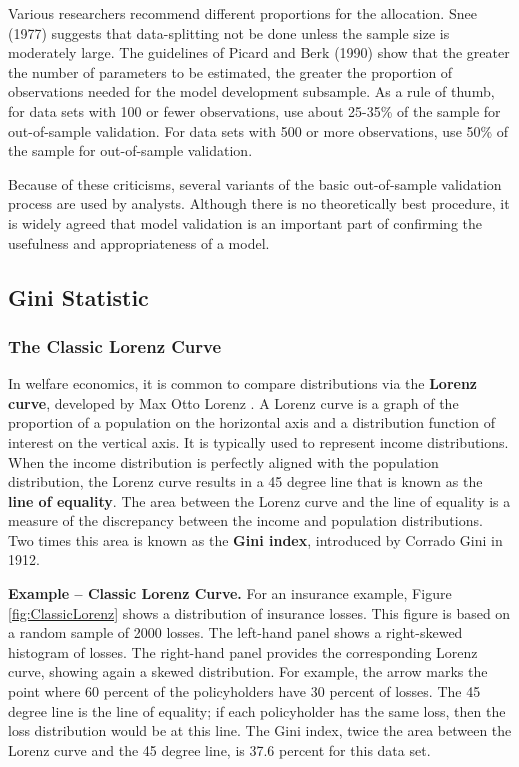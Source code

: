 \documentclass[]{book}
\theoremstyle{definition}
\theoremstyle{definition}
\theoremstyle{definition}
\theoremstyle{remark}
\begin{document}
Various researchers recommend different proportions for the allocation.
Snee (1977) suggests that data-splitting not be done unless the sample
size is moderately large. The guidelines of Picard and Berk (1990) show
that the greater the number of parameters to be estimated, the greater
the proportion of observations needed for the model development
subsample. As a rule of thumb, for data sets with 100 or fewer
observations, use about 25-35\% of the sample for out-of-sample
validation. For data sets with 500 or more observations, use 50\% of the
sample for out-of-sample validation.

Because of these criticisms, several variants of the basic out-of-sample
validation process are used by analysts. Although there is no
theoretically best procedure, it is widely agreed that model validation
is an important part of confirming the usefulness and appropriateness of
a model.

\subsection{Gini Statistic}\label{gini-statistic}

\subsubsection{The Classic Lorenz Curve}\label{the-classic-lorenz-curve}

In welfare economics, it is common to compare distributions via the
\textbf{Lorenz curve}, developed by Max Otto Lorenz
\citep{lorenz1905methods}. A Lorenz curve is a graph of the proportion
of a population on the horizontal axis and a distribution function of
interest on the vertical axis. It is typically used to represent income
distributions. When the income distribution is perfectly aligned with
the population distribution, the Lorenz curve results in a 45 degree
line that is known as the \textbf{line of equality}. The area between
the Lorenz curve and the line of equality is a measure of the
discrepancy between the income and population distributions. Two times
this area is known as the \textbf{Gini index}, introduced by Corrado
Gini in 1912.

\textbf{Example -- Classic Lorenz Curve.} For an insurance example,
Figure \ref{fig:ClassicLorenz} shows a distribution of insurance losses.
This figure is based on a random sample of 2000 losses. The left-hand
panel shows a right-skewed histogram of losses. The right-hand panel
provides the corresponding Lorenz curve, showing again a skewed
distribution. For example, the arrow marks the point where 60 percent of
the policyholders have 30 percent of losses. The 45 degree line is the
line of equality; if each policyholder has the same loss, then the loss
distribution would be at this line. The Gini index, twice the area
between the Lorenz curve and the 45 degree line, is 37.6 percent for
this data set.
\end{document}
